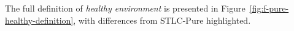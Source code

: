

The full definition of \emph{healthy environment} is presented in
Figure~\ref{fig:f-pure-healthy-definition}, with differences from
STLC-Pure highlighted.

